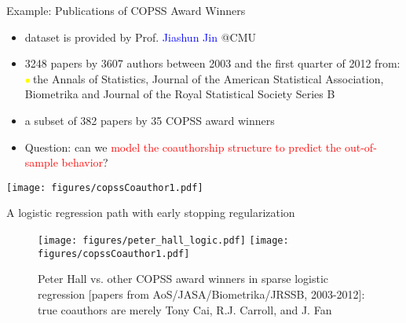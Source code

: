 \documentclass[slidestop,compress,9pt,epsfig,color]{beamer}
\theoremstyle{example}
\providecommand{\subitem}{\\ \textcolor{yellow}{$\bullet\ $}}
\begin{document}
\begin{frame}{Example: Publications of COPSS Award Winners}
\begin{itemize}
\item dataset is provided by Prof. \textcolor{blue}{Jiashun Jin} @CMU
\item 3248 papers by 3607 authors between 2003 and the first quarter of 2012 from:
\subitem the Annals of Statistics, Journal of the American Statistical Association, Biometrika and Journal of the Royal Statistical Society Series B
\item a subset of 382 papers by 35 COPSS award winners
\item Question: can we \textcolor{red}{model the coauthorship structure to predict the out-of-sample behavior}?
\end{itemize}
\centering
\texttt{[image: figures/copssCoauthor1.pdf]}
\end{frame}

\begin{frame}{A logistic regression path with early stopping regularization}
\begin{figure}
\centering
\texttt{[image: figures/peter\_hall\_logic.pdf]}
\texttt{[image: figures/copssCoauthor1.pdf]}
\caption{Peter Hall vs. other COPSS award winners in sparse logistic regression [papers from AoS/JASA/Biometrika/JRSSB, 2003-2012]: true coauthors are merely Tony Cai, R.J. Carroll, and J. Fan}
\end{figure}
\end{frame}
\end{document}
